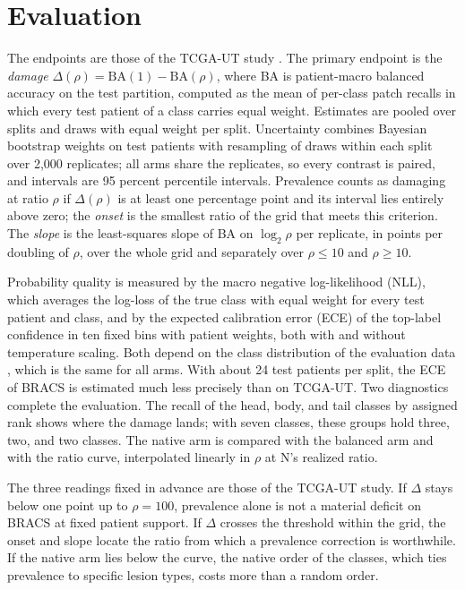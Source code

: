 \documentclass[11pt]{article}
\begin{document}
\section{Evaluation}
\label{sec:evaluation}
The endpoints are those of the TCGA-UT study \citep{queisler2026prevalenceTcga}. The primary endpoint is the \emph{damage} $\Delta(\rho)=\mathrm{BA}(1)-\mathrm{BA}(\rho)$, where BA is patient-macro balanced accuracy on the test partition, computed as the mean of per-class patch recalls in which every test patient of a class carries equal weight. Estimates are pooled over splits and draws with equal weight per split. Uncertainty combines Bayesian bootstrap weights on test patients \citep{rubin1981bayesian} with resampling of draws within each split over 2,000 replicates; all arms share the replicates, so every contrast is paired, and intervals are 95 percent percentile intervals. Prevalence counts as damaging at ratio $\rho$ if $\Delta(\rho)$ is at least one percentage point and its interval lies entirely above zero; the \emph{onset} is the smallest ratio of the grid that meets this criterion. The \emph{slope} is the least-squares slope of BA on $\log_2\rho$ per replicate, in points per doubling of $\rho$, over the whole grid and separately over $\rho\leq10$ and $\rho\geq10$.

Probability quality is measured by the macro negative log-likelihood (NLL), which averages the log-loss of the true class with equal weight for every test patient and class, and by the expected calibration error (ECE) of the top-label confidence in ten fixed bins with patient weights, both with and without temperature scaling. Both depend on the class distribution of the evaluation data \citep{mosquera2024classImbalance}, which is the same for all arms. With about 24 test patients per split, the ECE of BRACS is estimated much less precisely than on TCGA-UT. Two diagnostics complete the evaluation. The recall of the head, body, and tail classes by assigned rank shows where the damage lands; with seven classes, these groups hold three, two, and two classes. The native arm is compared with the balanced arm and with the ratio curve, interpolated linearly in $\rho$ at N's realized ratio.

The three readings fixed in advance are those of the TCGA-UT study. If $\Delta$ stays below one point up to $\rho=100$, prevalence alone is not a material deficit on BRACS at fixed patient support. If $\Delta$ crosses the threshold within the grid, the onset and slope locate the ratio from which a prevalence correction is worthwhile. If the native arm lies below the curve, the native order of the classes, which ties prevalence to specific lesion types, costs more than a random order.





\end{document}
